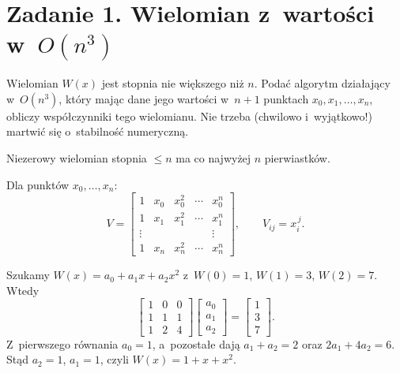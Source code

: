\documentclass[11pt]{article}
\begin{document}
\section{Zadanie 1. Wielomian z~wartości w~\texorpdfstring{$O(n^3)$}{O(n³)}}
\begin{tresc}
Wielomian $W(x)$ jest stopnia nie większego niż $n$. Podać algorytm
działający w~$O(n^3)$, który mając dane jego wartości w~$n+1$ punktach
$x_0,x_1,\ldots,x_n$, obliczy współczynniki tego wielomianu. Nie trzeba
(chwilowo i~wyjątkowo!) martwić się o~stabilność numeryczną.
\end{tresc}

\begin{teoria}
\begin{fakt}\label{fakt:pierwiastki}
Niezerowy wielomian stopnia $\le n$ ma co najwyżej $n$ pierwiastków.
\end{fakt}
\begin{definicja}
Dla punktów $x_0,\ldots,x_n$:
\[
V=\begin{bmatrix}
1&x_0&x_0^2&\cdots&x_0^n\\
1&x_1&x_1^2&\cdots&x_1^n\\
\vdots&&&&\vdots\\
1&x_n&x_n^2&\cdots&x_n^n
\end{bmatrix},\qquad V_{ij}=x_i^{\,j}.
\]
\end{definicja}
\end{teoria}

\begin{przyklad}
Szukamy $W(x)=a_0+a_1x+a_2x^2$ z~$W(0)=1$, $W(1)=3$, $W(2)=7$. Wtedy
\[
\begin{bmatrix}1&0&0\\1&1&1\\1&2&4\end{bmatrix}
\begin{bmatrix}a_0\\a_1\\a_2\end{bmatrix}
=\begin{bmatrix}1\\3\\7\end{bmatrix}.
\]
Z~pierwszego równania $a_0=1$, a~pozostałe dają $a_1+a_2=2$ oraz
$2a_1+4a_2=6$. Stąd $a_2=1$, $a_1=1$, czyli $W(x)=1+x+x^2$.
\end{przyklad}
\end{document}

